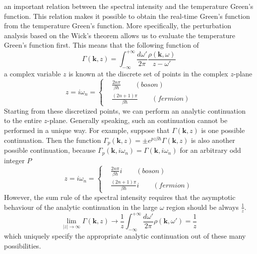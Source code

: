 an important relation between the spectral intensity and the temperature Green's function.
 This relation makes it possible to obtain the real-time Green's function from the temperature Green's function.
 More specifically, the perturbation analysis based on the Wick's theorem allows us to evaluate the temperature Green's function first.
 This means that the following function of 
\begin{equation}
\Gamma(\mathbf k,z)=\int _{-\infty}^{+\infty} \frac{d\omega'}{2\pi} \frac{\rho(\mathbf k,\omega)}{z-\omega'}
\end{equation}
a complex variable $z$ is known at the discrete set of points in the complex $z$-plane
\[
z=i\omega_n=
\left\{
\begin{aligned}
&\frac{2n\pi}{\beta\hbar}\qquad (boson)\\
&\frac{(2n+1)\pi}{\beta\hbar} \qquad (fermion)
\end{aligned}
\right.
\]
 Starting from these discretized points, we can perform an analytic continuation to the entire $z$-plane.
 Generally speaking, such an continuation cannot be performed in a unique way.
 For example, suppose that $\Gamma(\mathbf k,z)$ is one possible continuation.
 Then the function $\Gamma_p(\mathbf k,z)=\pm e^{p z \beta \hbar}\Gamma(\mathbf k,z)$ is also another possible continuation, because $\Gamma_p(\mathbf k,i\omega_n)=\Gamma(\mathbf k,i\omega_n)$ for an arbitrary odd integer $P$
\[
z=i\omega_n=
\left\{
\begin{aligned}
&\frac{2n\pi}{\beta\hbar}i\qquad (boson)\\
&\frac{(2n+1)\pi}{\beta\hbar}i \qquad (fermion)
\end{aligned}
\right.
\]
 However, the sum rule of the spectral intensity requires that the asymptotic behaviour of the analytic continuation in the large $\omega$ region should be always $\frac{1}{z}$.
\[
\lim_{|z|\to \infty} \Gamma(\mathbf k,z) \to \frac{1}{z} \int_{-\infty}^{+\infty} \frac{d\omega'}{2\pi} \rho(\mathbf k,\omega') =\frac{1}{z}
\]
which uniquely specify the appropriate analytic continuation out of these many possibilities.








